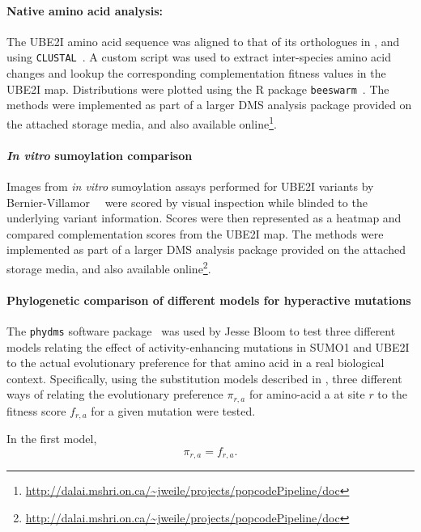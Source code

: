 \paragraph{Native amino acid analysis:} The UBE2I amino acid sequence was aligned to that of its orthologues in ,  and  using \texttt{CLUSTAL}~\cite{russell_clustal_2014}. A custom script was used to extract inter-species amino acid changes and lookup the corresponding complementation fitness values in the UBE2I map. Distributions were plotted using the R package \texttt{beeswarm}~\cite{eklund_bee_2016}. The methods were implemented as part of a larger DMS analysis package provided on the attached storage media, and also available online\footnote{\url{http://dalai.mshri.on.ca/~jweile/projects/popcodePipeline/doc}}.

\paragraph{\textit{In vitro} sumoylation comparison} Images from \textit{in vitro} sumoylation assays performed for UBE2I variants by Bernier-Villamor~\etal~\cite{bernier-villamor_structural_2002} were scored by visual inspection while blinded to the underlying variant information. Scores were then represented as a heatmap and compared complementation scores from the UBE2I map. The methods were implemented as part of a larger DMS analysis package provided on the attached storage media, and also available online\footnote{\url{http://dalai.mshri.on.ca/~jweile/projects/popcodePipeline/doc}}.

\paragraph{Phylogenetic comparison of different models for hyperactive mutations}
The \texttt{phydms} software package~\cite{bloom_identification_2017} was used by Jesse Bloom to test three different models relating the effect of activity-enhancing mutations in SUMO1 and UBE2I to the actual evolutionary preference for that amino acid in a real biological context. Specifically, using the substitution models described in \cite{bloom_identification_2017}, three different ways of relating the evolutionary preference $\pi_{r,a}$ for amino-acid a at site $r$ to the fitness score $f_{r,a}$ for a given mutation were tested. 

In the first model, $$\pi_{r,a} = f_{r,a}.$$ 


